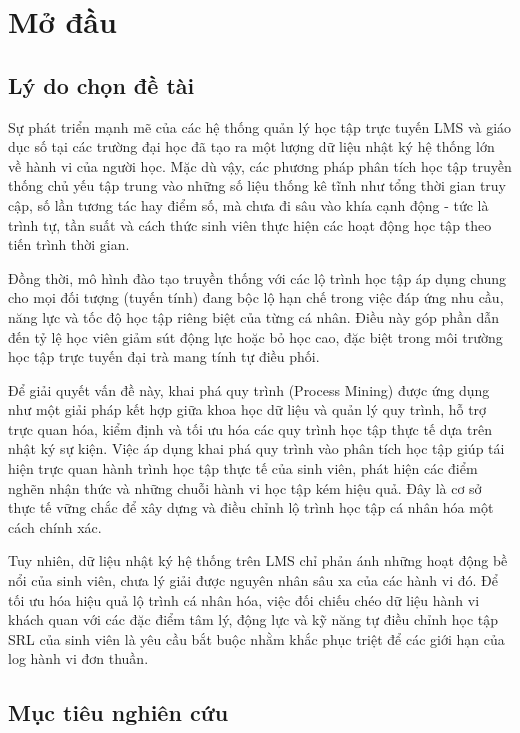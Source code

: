 \section{Mở đầu}

\subsection{Lý do chọn đề tài}

Sự phát triển mạnh mẽ của các hệ thống quản lý học tập trực tuyến LMS và giáo dục số tại các trường đại học đã tạo ra một lượng dữ liệu nhật ký hệ thống lớn về hành vi của người học. Mặc dù vậy, các phương pháp phân tích học tập truyền thống chủ yếu tập trung vào những số liệu thống kê tĩnh như tổng thời gian truy cập, số lần tương tác hay điểm số, mà chưa đi sâu vào khía cạnh động - tức là trình tự, tần suất và cách thức sinh viên thực hiện các hoạt động học tập theo tiến trình thời gian.

Đồng thời, mô hình đào tạo truyền thống với các lộ trình học tập áp dụng chung cho mọi đối tượng (tuyến tính) đang bộc lộ hạn chế trong việc đáp ứng nhu cầu, năng lực và tốc độ học tập riêng biệt của từng cá nhân. Điều này góp phần dẫn đến tỷ lệ học viên giảm sút động lực hoặc bỏ học cao, đặc biệt trong môi trường học tập trực tuyến đại trà mang tính tự điều phối.

Để giải quyết vấn đề này, khai phá quy trình (Process Mining) được ứng dụng như một giải pháp kết hợp giữa khoa học dữ liệu và quản lý quy trình, hỗ trợ trực quan hóa, kiểm định và tối ưu hóa các quy trình học tập thực tế dựa trên nhật ký sự kiện. Việc áp dụng khai phá quy trình vào phân tích học tập giúp tái hiện trực quan hành trình học tập thực tế của sinh viên, phát hiện các điểm nghẽn nhận thức và những chuỗi hành vi học tập kém hiệu quả. Đây là cơ sở thực tế vững chắc để xây dựng và điều chỉnh lộ trình học tập cá nhân hóa một cách chính xác.

Tuy nhiên, dữ liệu nhật ký hệ thống trên LMS chỉ phản ánh những hoạt động bề nổi của sinh viên, chưa lý giải được nguyên nhân sâu xa của các hành vi đó. Để tối ưu hóa hiệu quả lộ trình cá nhân hóa, việc đối chiếu chéo dữ liệu hành vi khách quan với các đặc điểm tâm lý, động lực và kỹ năng tự điều chỉnh học tập SRL của sinh viên là yêu cầu bắt buộc nhằm khắc phục triệt để các giới hạn của log hành vi đơn thuần.

\subsection{Mục tiêu nghiên cứu}

